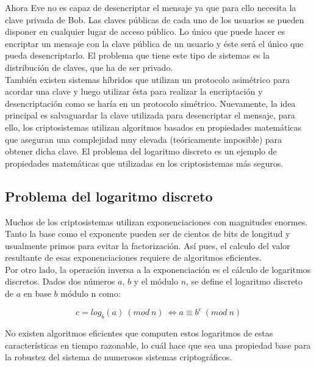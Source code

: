 \documentclass[../PFC.tex]{subfiles}
\begin{document}
Ahora Eve no es capaz de desencriptar el mensaje ya que para ello necesita la clave privada de Bob. Las claves públicas de cada uno de los usuarios se pueden disponer en cualquier lugar de acceso público. Lo único que puede hacer es encriptar un mensaje con la clave pública de un usuario y éste será el único que pueda desencriptarlo. El problema que tiene este tipo de sistemas es la distribución de claves, que ha de ser privado.
\*
\vspace{0.5515cm}
\\
También existen sistemas híbridos que utilizan un protocolo asimétrico para acordar una clave y luego utilizar ésta para realizar la encriptación y desencriptación como se haría en un protocolo simétrico. Nuevamente, la idea principal es salvaguardar la clave utilizada para desencriptar el mensaje, para ello, los criptosistemas utilizan algoritmos basados en propiedades matemáticas que aseguran una complejidad muy elevada (teóricamente imposible) para obtener dicha clave. El problema del logaritmo discreto es un ejemplo de propiedades matemáticas que utilizadas en los criptosistemas más seguros.

\subsection{Problema del logaritmo discreto}
\label{Problema del logaritmo discreto}

Muchos de los criptosistemas utilizan exponenciaciones con magnitudes enormes. Tanto la base como el exponente pueden ser de cientos de bits de longitud y usualmente primos para evitar la factorización. Así pues, el calculo del valor resultante de esas exponenciaciones requiere de algoritmos eficientes. 
\*
\vspace{0.5515cm}
\\
Por otro lado, la operación inversa a la exponenciación es el cálculo de logaritmos discretos. Dados dos números $a$, $b$ y el módulo $n$, se define el logaritmo discreto de $a$ en base $b$ módulo n como\cite{lucena}:

\begin{equation}
c = log_{b}(a)\ (mod\ n)\ \Leftrightarrow a \equiv b^c\ (mod\ n)
\end{equation}

No existen algoritmos eficientes que computen estos logaritmos de estas características en tiempo razonable, lo cuál hace que sea una propiedad base para la robustez del sistema de numerosos sistemas criptográficos.
\end{document}
